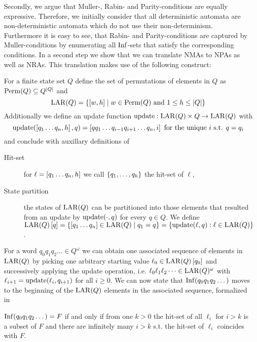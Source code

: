 Secondly, we argue that Muller-, Rabin- and Parity-conditions are
equally expressive. Therefore, we initially consider that all deterministic
automata are non-deterministic automata which do not use their
non-determinism. Furthermore it is easy to see, that Rabin- and
Parity-conditions are captured by Muller-conditions by enumerating all
$\operatorname{Inf}$-sets that satisfy the corresponding conditions. In a second step we
show that we can translate \acp{NMA} to \acp{NPA} as well as \acp{NRA}. This
translation makes use of the following construct:
\begin{definition}
  For a finite state set $Q$ define the set of permutations of elements in
  $Q$ as $\operatorname{Perm}(Q)\subseteq Q^{\left\vert{Q}\right\vert}$ and
  \begin{equation*}
    \operatorname{LAR}(Q) = \left\{\left[w,h\right]\mid w\in\operatorname{Perm}(Q)\text{ and }1\leq
    h\leq\left\vert{Q}\right\vert\right\}
  \end{equation*}
  Additionally we define an update function
  $\operatorname{update}:\operatorname{LAR}(Q)\times Q\rightarrow\operatorname{LAR}(Q)$ with
  \begin{equation*}
    \operatorname{update}(\left[q_{1}\dots q_{n},h\right], q)
    = \left[qq_{1}\dots q_{i-1}q_{i+1}\dots q_{n},i\right]
    \text{ for the unique }i\text{ s.t. }q=q_{i}
  \end{equation*}
  and conclude with auxillary definitions of
  \begin{description}
    \item [Hit-set] for $\ell = \left[q_{1}\dots q_{n},h\right]$ we call
      $\left\{q_{1},\dots,q_{h}\right\}$ the hit-set of $\ell$,
    \item [State partition] the states of $\operatorname{LAR}(Q)$ can be partitioned into
      those elements that resulted from an update by $\operatorname{update}(\cdot, q)$ for
      every $q\in Q$. We define
      $\operatorname{LAR}(Q)\left[q\right] = \left\{\left[q_{1}\dots q_{n}\right]\in\operatorname{LAR}(Q)\mid
        q_{1} = q\right\} = \left\{\operatorname{update}(\ell, q):\ell\in\operatorname{LAR}(Q)\right\}$.
  \end{description}
\end{definition}
For a word $q_{0}q_{1}q_{2}\dots\in Q^{\omega}$ we can obtain one associated
sequence of elements in $\operatorname{LAR}(Q)$ by picking one arbitrary starting value
$\ell_{0}\in\operatorname{LAR}(Q)\left[q_{0}\right]$ and successively applying the update
operation, i.e. $\ell_{0}\ell_{1}\ell_{2}\dots\in\operatorname{LAR}(Q)^{\omega}$ with
$\ell_{i+1} = \operatorname{update}(\ell_{i},q_{i+1})$ for all $i\geq 0$. We can now state that
$\operatorname{Inf}(q_{0}q_{1}q_{2}\dots)$ moves to the beginning of the $\operatorname{LAR}(Q)$ elements 
in the associated sequence, formalized in
\begin{lemma}
  \cite[Lemma 1.21]{AutoLogInfGames}
  $\operatorname{Inf}(q_{0}q_{1}q_{2}\dots) = F$ if and only if from one $k>0$ the hit-set 
  of all $\ell_{i}$ for $i>k$ is a subset of $F$ and there are infinitely 
  many $i>k$ s.t. the hit-set of $\ell_{i}$ coincides with $F$.
  \label{lem:larhitset}
\end{lemma}
